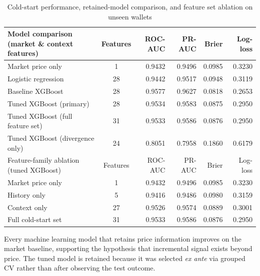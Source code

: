 \documentclass[11pt,a4paper]{article}
\newcommand{\edit}[1]{#1}
\begin{document}
\vspace{-1em}
\begin{table}[H]
\centering
\small
\begin{tabular}{lcrrrr}
\toprule
Model comparison (market \& context features) & Features & ROC-AUC & PR-AUC & Brier & Log-loss \\
\midrule
Market price only            & 1  & 0.9432 & 0.9496 & 0.0985 & 0.3230 \\
Logistic regression          & 28 & 0.9442 & 0.9517 & 0.0948 & 0.3119 \\
Baseline XGBoost             & 28 & 0.9577 & 0.9627 & 0.0818 & 0.2653 \\
Tuned XGBoost (primary)      & 28 & 0.9534 & 0.9583 & 0.0875 & 0.2950 \\
Tuned XGBoost (full feature set) & 31 & 0.9533 & 0.9586 & 0.0876 & 0.2950 \\
Tuned XGBoost (divergence only) & 24 & 0.8051 & 0.7958 & 0.1860 & 0.6179 \\
\bottomrule	

Feature-family ablation (tuned XGBoost) & Features & ROC-AUC & PR-AUC & Brier & Log-loss \\
\midrule
Market price only            &  1 & 0.9432 & 0.9496 & 0.0985 & 0.3230 \\
History only                 &  5 & \edit{0.9416} & \edit{0.9486} & \edit{0.0980} & \edit{0.3159} \\
Context only                 & 27 & \edit{0.9526} & \edit{0.9574} & \edit{0.0889} & \edit{0.3001} \\
Full cold-start set          & 31 & \edit{0.9533} & \edit{0.9586} & \edit{0.0876} & \edit{0.2950} \\
\bottomrule
\end{tabular}
\caption{Cold-start performance, retained-model comparison, and feature set ablation on unseen wallets}
\label{tab:ml_main_results}
\end{table}

Every machine learning model that retains price information improves on the market baseline, supporting the hypothesis that incremental signal exists beyond price. The tuned model is retained because it was selected \emph{ex ante} via grouped CV rather than after observing the test outcome.\\[-1em]
\end{document}
